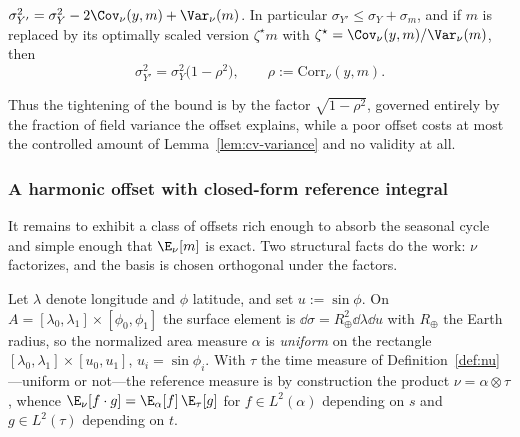 \begin{lemma}
\label{lem:cv-variance}
$\sigma_{Y'}^2=\sigma_Y^2-2\Cov_\nu(y,m)+\Var_\nu(m)$. In particular
$\sigma_{Y'}\le\sigma_Y+\sigma_m$, and if $m$ is replaced by its
optimally scaled version $\zeta^{\star}m$ with
$\zeta^{\star}=\Cov_\nu(y,m)/\Var_\nu(m)$, then
\[
  \sigma_{Y'}^2=\sigma_Y^2\big(1-\rho^2\big),
  \qquad \rho:=\mathrm{Corr}_\nu(y,m).
\]
\end{lemma}

Thus the tightening of the bound is by the factor $\sqrt{1-\rho^2}$,
governed entirely by the fraction of field variance the offset explains,
while a poor offset costs at most the controlled amount of
Lemma~\ref{lem:cv-variance} and no validity at all.

\subsubsection{A harmonic offset with closed-form reference integral}
\label{sec:harmonic}

It remains to exhibit a class of offsets rich enough to absorb the
seasonal cycle and simple enough that $\E_\nu[m]$ is exact. Two
structural facts do the work: $\nu$ factorizes, and the basis is chosen
orthogonal under the factors.

\begin{lemma}
\label{lem:nu-product}
Let $\lambda$ denote longitude and $\phi$ latitude, and set
$u:=\sin\phi$. On $A=[\lambda_0,\lambda_1]\times[\phi_0,\phi_1]$ the
surface element is $\dd\sigma=R_{\oplus}^2\dd\lambda\dd u$ with $R_{\oplus}$ the
Earth radius, so the normalized area measure $\alpha$ is
\emph{uniform} on the rectangle
$[\lambda_0,\lambda_1]\times[u_0,u_1]$, $u_i=\sin\phi_i$. With $\tau$ the
time measure of Definition~\ref{def:nu}---uniform or not---the reference
measure is by construction the product $\nu=\alpha\otimes\tau$, whence
$\E_\nu[f\cdot g]=\E_\alpha[f]\,\E_\tau[g]$ for $f\in L^2(\alpha)$
depending on $s$ and $g\in L^2(\tau)$ depending on $t$.
\end{lemma}

